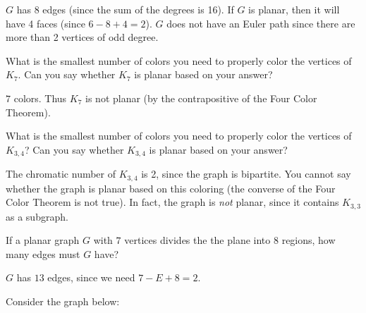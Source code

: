\begin{squestions}
  \begin{answer}
  $G$ has 8 edges (since the sum of the degrees is 16).  If $G$ is planar, then it will have 4 faces (since $6 - 8 + 4 = 2$).  $G$ does not have an Euler path since there are more than 2 vertices of odd degree.
  \end{answer}
 

  
\question What is the smallest number of colors you need to properly color the vertices of $K_{7}$.  Can you say whether $K_7$ is planar based on your answer?

  \begin{answer}
  $7$ colors.  Thus $K_7$ is not planar (by the contrapositive of the Four Color Theorem).
  \end{answer}


\question What is the smallest number of colors you need to properly color the vertices of $K_{3,4}$?  Can you say whether $K_{3,4}$ is planar based on your answer?

  \begin{answer}
  The chromatic number of $K_{3,4}$ is 2, since the graph is bipartite.  You cannot say whether the graph is planar based on this coloring (the converse of the Four Color Theorem is not true).  In fact, the graph is {\em not} planar, since it contains $K_{3,3}$ as a subgraph.
  \end{answer}


\question If a planar graph $G$ with $7$ vertices divides the the plane into 8 regions, how many edges must $G$ have?

  \begin{answer}
  $G$ has $13$ edges, since we need $7 - E + 8 = 2$.
  \end{answer}



\question Consider the graph below:
\begin{center}
\end{center}

\end{squestions}
